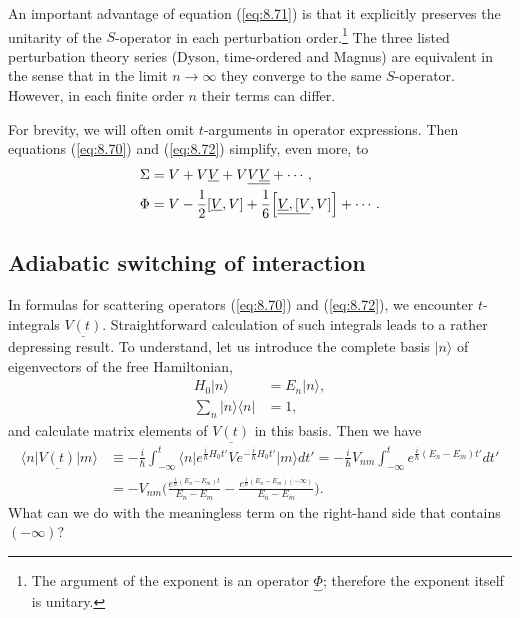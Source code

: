 \documentclass[]{stefan1}
\begin{document}
An important advantage of equation (\ref{eq:8.71}) is that it explicitly
preserves the unitarity of the $ S $-operator in each perturbation
order.\footnote{The argument of the exponent is an 
operator $ \underbrace{\Phi } $; therefore the exponent itself is
unitary.} The three listed perturbation theory series (Dyson,
time-ordered and Magnus) are equivalent in the sense that in the limit
$ n \to \infty $ they converge to the same $ S $-operator. However, in
each finite order $ n $ their terms can differ.

For brevity, we will often omit $ t $-arguments in operator expressions.
Then equations (\ref{eq:8.70}) and (\ref{eq:8.72}) simplify, even more,
to
%
\begin{align}
\Sigma &= V + V \underline{V} + V\underline{V \underline{V}} + \cdots ,
\label{eq:7.63c}
\\
\Phi &= V - \frac{1}{2} [ \underline{V}, V ] +\frac{1}{6} \Bigl[
\underline{\underline{V},[V},V] \Bigr] + \cdots . \label{eq:7.63b}
\end{align}

\subsection{Adiabatic switching of interaction}\label{ss:adiaba}
In formulas for scattering operators (\ref{eq:8.70}) and
(\ref{eq:8.72}), we encounter $ t $-integrals $ \underline{V (t)} $.
Straightforward calculation of such integrals leads to a rather
depressing result. To understand, let us introduce the complete basis
$ | n \rangle $ of eigenvectors of the free Hamiltonian,\vspace*{-6pt}
%
\begin{align}
H_{0} |n\rangle &= E_{n}|n\rangle , \label{eq:basis1}
\\
\sum_{n}|n \rangle \langle n | &= 1,
\label{eq:basis2}
\end{align}
and calculate matrix elements of $\underline{V(t)}$ in this basis. Then
we have
%
\begin{align}
\langle n \vert \underline{V(t)} \vert m \rangle &\equiv
-\frac{i}{\hbar } \int
_{-\infty }^{t} \langle n \vert e
^{\frac{i}{\hbar }H_{0}t'} V e^{-\frac{i}{\hbar }H_{0}t'} \vert m \rangle dt' =
-\frac{i}{\hbar } V_{nm} \int
_{-\infty } ^{t}
e^{\frac{i}{\hbar }(E_{n}-E_{m})t'} dt'
\nonumber
\\
&= - V_{nm} \biggl( \frac{
e^{\frac{i}{\hbar }(E_{n}-E_{m})t}}{E_{n}-E
_{m}} - \frac{
e^{\frac{i}{\hbar }(E_{n}-E_{m})(-\infty )}}{ E_{n}-E
_{m}} \biggr) .
\label{eq:9.54}
\end{align}
What can we do with the meaningless term on the right-hand side that
contains $(-\infty )$?
\end{document}
